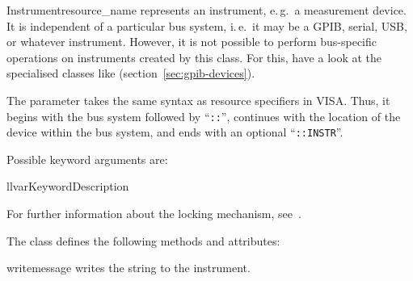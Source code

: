 \documentclass{howto}
\begin{document}
\begin{classdesc}{Instrument}{resource_name}
  represents an instrument, e.\,g.\ a measurement device.  It is independent of
  a particular bus system, i.\,e.\ it may be a GPIB, serial, USB, or whatever
  instrument.  However, it is not possible to perform bus-specific operations
  on instruments created by this class.  For this, have a look at the
  specialised classes like 
  (section~\ref{sec:gpib-devices}).

  The parameter  takes the same syntax as resource
  specifiers in VISA\@.  Thus, it begins with the bus system followed by
  ``\verb|::|'', continues with the location of the device within the bus
  system, and ends with an optional ``\verb|::INSTR|''.

  Possible keyword arguments are:
  \begin{tableii}{ll}{var}{Keyword}{Description}
  \end{tableii}

  \vspace{1ex}
  For further information about the locking mechanism,
  see~.
\end{classdesc}

The class  defines the following methods and attributes:

\begin{methoddesc}{write}{message}
  writes the string  to the instrument.
\end{methoddesc}
\end{document}
